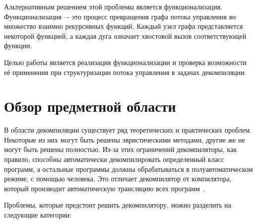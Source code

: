 Альтернативным решением этой проблемы является функционализация. Функционализация –- это процесс превращения графа потока управления во множество взаимно рекурсивных функций. Каждый узел графа представляется некоторой функцией, а каждая дуга означает хвостовой вызов соответствующей функции.

Целью работы является реализация функционализации и проверка возможности её применения при структуризации потока управления в задачах декомпиляции.



\section{Обзор предметной области}

В области декомпиляции существует ряд теоретических и практических проблем. Некоторые из них могут быть решены эвристическими методами, другие же не могут быть решены полностью. Из-за этих ограничений декомпиляторы, как правило, способны автоматически декомпилировать определенный класс программ, а остальные программы должны обрабатываться в полуавтоматическом режиме, с помощью человека. Это отличает декомпилятор от компилятора, который производит автоматическую трансляцию всех программ~\cite{decompilation}.

Проблемы, которые предстоит решить декомпилятору, можно разделить на следующие категории:
\label{deproblems}

